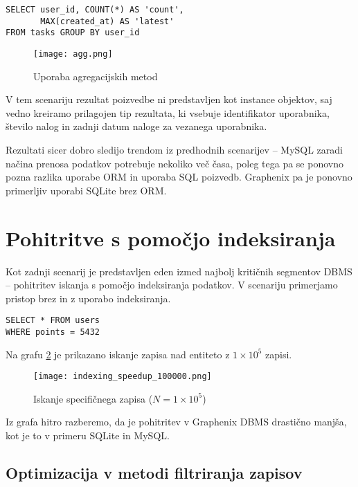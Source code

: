 \documentclass[a4paper,12pt,openright]{book}
\begin{document}
\begin{verbatim}
SELECT user_id, COUNT(*) AS 'count', 
       MAX(created_at) AS 'latest' 
FROM tasks GROUP BY user_id
\end{verbatim}

    \begin{figure}[H]
        \centerline{\texttt{[image: agg.png]}}
        \caption{Uporaba agregacijskih metod}
        \label{agg}
    \end{figure}

    \noindent
    V tem scenariju rezultat poizvedbe ni predstavljen kot instance objektov, saj vedno kreiramo prilagojen tip rezultata, ki vsebuje identifikator uporabnika, število nalog in zadnji datum naloge za vezanega uporabnika.

    Rezultati sicer dobro sledijo trendom iz predhodnih scenarijev – MySQL zaradi načina prenosa podatkov potrebuje nekoliko več časa, poleg tega pa se ponovno pozna razlika uporabe ORM in uporaba SQL poizvedb. Graphenix pa je ponovno primerljiv uporabi SQLite brez ORM.

    \section{Pohitritve s pomočjo indeksiranja}

    Kot zadnji scenarij je predstavljen eden izmed najbolj kritičnih segmentov DBMS – pohitritev iskanja s pomočjo indeksiranja podatkov. V scenariju primerjamo pristop brez in z uporabo indeksiranja.
    
\begin{verbatim}
SELECT * FROM users
WHERE points = 5432
\end{verbatim}

    \noindent
    Na grafu \ref{old_speedup} je prikazano iskanje zapisa nad entiteto z $ 1 \times 10^5$ zapisi.

    \begin{figure}[H]
        \centerline{\texttt{[image: indexing\_speedup\_100000.png]}}
        \caption{Iskanje specifičnega zapisa ($N = 1 \times 10^5$)}
        \label{old_speedup}
    \end{figure}

    \noindent
    Iz grafa hitro razberemo, da je pohitritev v Graphenix DBMS drastično manjša, kot je to v primeru SQLite in MySQL.

    \subsection{Optimizacija v metodi filtriranja zapisov}
\end{document}
